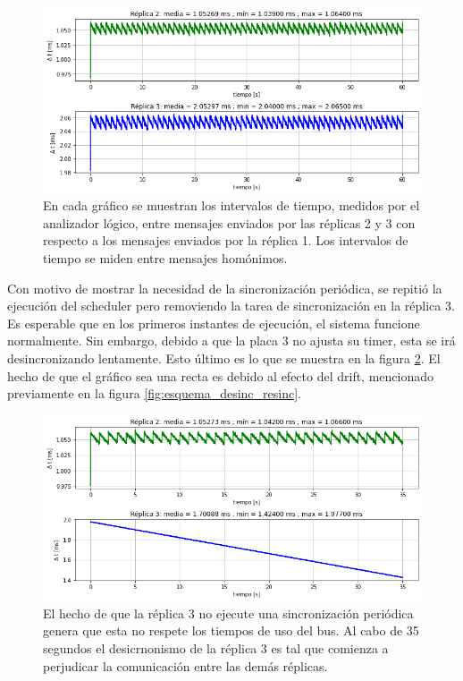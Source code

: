 \begin{figure}[!t]
    \centering
    \includegraphics[width=\textwidth]{img/resultados_sincronizacion_sin_fallas.png}
    \caption{En cada gráfico se muestran los intervalos de tiempo, medidos por el analizador lógico, entre mensajes enviados por las réplicas 2 y 3 con respecto a los mensajes enviados por la réplica 1. Los intervalos de tiempo se miden entre mensajes homónimos.}
    \label{fig:resultados_sincronizacion_sin_fallas}
\end{figure}

Con motivo de mostrar la necesidad de la sincronización periódica, se repitió la ejecución del scheduler pero removiendo la tarea de sincronización en la réplica 3. Es esperable que en los primeros instantes de ejecución, el sistema funcione normalmente. Sin embargo, debido a que la placa 3 no ajusta su timer, esta se irá desincronizando lentamente. Esto último es lo que se muestra en la figura \ref{fig:resultados_no_sync}. El hecho de que el gráfico sea una recta es debido al efecto del drift, mencionado previamente en la figura \ref{fig:esquema_desinc_resinc}. 

\begin{figure}[!t]
    \centering
    \includegraphics[width=\textwidth]{img/resultados_no_sync.png}
    \caption{El hecho de que la réplica 3 no ejecute una sincronización periódica genera que esta no respete los tiempos de uso del bus. Al cabo de 35 segundos el desicrnonismo de la réplica 3 es tal que comienza a perjudicar la comunicación entre las demás réplicas.}
    \label{fig:resultados_no_sync}
\end{figure}

